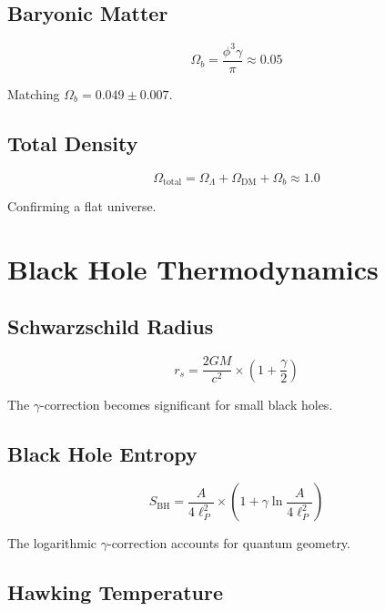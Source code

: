 \documentclass[12pt,a4paper]{article}
\begin{document}
\subsection{Baryonic Matter}

\begin{equation}
\Omega_b = \frac{\phi^3 \gamma}{\pi} \approx 0.05
\end{equation}

Matching $\Omega_b = 0.049 \pm 0.007$.

\subsection{Total Density}

\begin{equation}
\Omega_{\text{total}} = \Omega_\Lambda + \Omega_{\text{DM}} + \Omega_b \approx 1.0
\end{equation}

Confirming a flat universe.

\section{Black Hole Thermodynamics}

\subsection{Schwarzschild Radius}

\begin{equation}
r_s = \frac{2GM}{c^2} \times \left(1 + \frac{\gamma}{2}\right)
\end{equation}

The $\gamma$-correction becomes significant for small black holes.

\subsection{Black Hole Entropy}

\begin{equation}
S_{\text{BH}} = \frac{A}{4\ell_P^2} \times \left(1 + \gamma \ln\frac{A}{4\ell_P^2}\right)
\end{equation}

The logarithmic $\gamma$-correction accounts for quantum geometry.

\subsection{Hawking Temperature}
\end{document}
